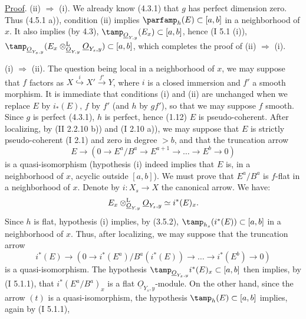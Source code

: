 \uline{Proof}. (ii) \(\Longrightarrow\) (i). We already know (4.3.1) that \(g\) has perfect dimension zero. Thus (4.5.1 a)), condition (ii) implies \(\parfamp_h(E)\subset[a,b]\) in a neighborhood of \(x\). It also implies (by 4.3), \(\tamp_{\underline{O}_{Y,y}}(E_x)\subset[a,b]\), hence (I 5.1 (i)), \(\tamp_{\underline{O}_{Y_s,y}}(E_x\otimes_{\underline{O}_{Y,y}}^{\mathrm L}\underline{O}_{Y_s,y})\subset[a,b]\), which
%
completes the proof of (ii) \(\Longrightarrow\) (i).

(i) \(\Longrightarrow\) (ii). The question being local in a neighborhood of \(x\), we may suppose that \(f\) factors as \(X\overset{i}{\hookrightarrow}X'\overset{f'}{\longrightarrow}Y\), where \(i\) is a closed immersion and \(f'\) a smooth morphism. It is immediate that conditions (i) and (ii) are unchanged when we replace \(E\) by \(i_*(E)\), \(f\) by \(f'\) (and \(h\) by \(gf'\)), so that we may suppose \(f\) smooth. Since \(g\) is perfect (4.3.1), \(h\) is perfect, hence (1.12) \(E\) is pseudo-coherent. After localizing, by (II 2.2.10 b)) and (I 2.10 a)), we may suppose that \(E\) is strictly pseudo-coherent (I 2.1) and zero in degree \(>b\), and that the truncation arrow
\begin{equation}
 E\longrightarrow(0\longrightarrow E^a/B^a\longrightarrow E^{a+1}\longrightarrow\ldots\longrightarrow E^b\longrightarrow0)\tag*{$t)$}
\end{equation}
is a quasi-isomorphism (hypothesis (i) indeed implies that \(E\) is, in a neighborhood of \(x\), acyclic outside \([a,b]\)). We must prove that \(E^a/B^a\) is \(f\)-flat in a neighborhood of \(x\). Denote by \(i:X_s\longrightarrow X\) the canonical arrow. We have:
\begin{equation}
 E_x\otimes_{\underline{O}_{Y,y}}^{\mathrm L}\underline{O}_{Y_s,y}\simeq i^*(E)_x.\notag
\end{equation}
Since \(h\) is flat, hypothesis (i) implies, by (3.5.2), \(\tamp_{h_s}(i^*(E))\subset[a,b]\) in a neighborhood of \(x\). Thus, after localizing, we may suppose that the truncation arrow
\begin{equation}
 i^*(E)\longrightarrow(0\longrightarrow i^*(E^a)/B^a(i^*(E))\longrightarrow\ldots\longrightarrow i^*(E^b)\longrightarrow0)\tag*{$i^*(t)$}
\end{equation}
is a quasi-isomorphism. The hypothesis \(\tamp_{\underline{O}_{Y_s,y}}i^*(E)_x\subset[a,b]\) then implies, by (I 5.1.1), that \(i^*(E^a/B^a)_x\) is a flat \(\underline{O}_{Y_s,y}\)-module. On the other hand, since the arrow \((t)\) is a quasi-isomorphism, the hypothesis \(\tamp_h(E)\subset[a,b]\) implies, again by (I 5.1.1),
